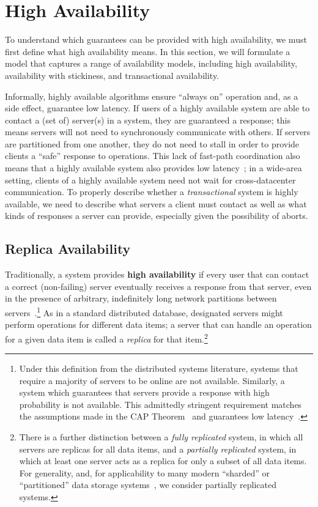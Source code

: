 
\section{High Availability}
\label{sec:availability}

To understand which guarantees can be provided with high availability,
we must first define what high availability means. In this section, we
will formulate a model that captures a range of availability models,
including high availability, availability with stickiness, and
transactional availability.

Informally, highly available algorithms ensure ``always on'' operation
and, as a side effect, guarantee low latency. If users of a highly
available system are able to contact a (set of) server(s) in a system,
they are guaranteed a response; this means servers will not need to
synchronously communicate with others. If servers are partitioned from one
another, they do not need to stall in order to provide clients a
``safe'' response to operations. This lack of fast-path coordination
also means that a highly available system also provides low
latency~\cite{abadi-pacelc}; in a wide-area setting, clients of a
highly available system need not wait for cross-datacenter
communication. To properly describe whether a \textit{transactional}
system is highly available, we need to describe what servers a client
must contact as well as what kinds of responses a server can provide,
especially given the possibility of aborts.

\subsection{Replica Availability}

Traditionally, a system provides {\textbf{high availability}} if every
user that can contact a correct (non-failing) server eventually
receives a response from that server, even in the presence of
arbitrary, indefinitely long network partitions between
servers~\cite{gilbert-cap}.\footnote{Under this definition from the
  distributed systems literature, systems that require a majority of
  servers to be online are not available. Similarly, a system which
  guarantees that servers provide a response with high probability is
  not available. This admittedly stringent requirement matches the
  assumptions made in the CAP Theorem~\cite{gilbert-cap} and
  guarantees low latency~\cite{abadi-pacelc}.} As in a standard
distributed database, designated servers might perform operations for
different data items; a server that can handle an operation for a
given data item is called a \textit{replica} for that
item.\footnote{There is a further distinction between a \textit{fully
    replicated} system, in which all servers are replicas for all data
  items, and a \textit{partially replicated} system, in which at least
  one server acts as a replica for only a subset of all data
  items. For generality, and, for applicability to many modern
  ``sharded'' or ``partitioned'' data storage systems~\cite{ bigtable,
    pnuts, spanner, dynamo, hstore}, we consider partially replicated
  systems.}

